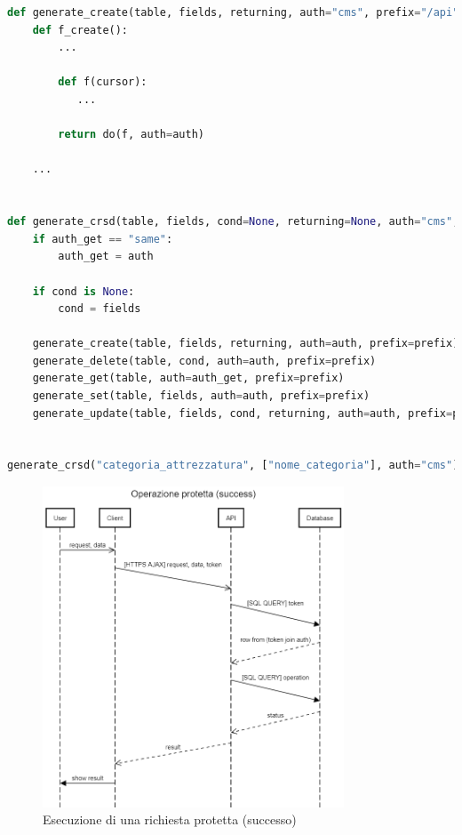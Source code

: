 \documentclass[12pt,a4paper,twoside,english,italian]{book}
\begin{document}
\begin{lstlisting}[language=Python, caption=Esempio di funzione generatrice di endpoint modificata e relativa chiamata]
def generate_create(table, fields, returning, auth="cms", prefix="/api"):
    def f_create():
        ...

        def f(cursor):
           ...

        return do(f, auth=auth)

    ...
    
    
def generate_crsd(table, fields, cond=None, returning=None, auth="cms", auth_get="login", prefix="/api"):
    if auth_get == "same":
        auth_get = auth

    if cond is None:
        cond = fields

    generate_create(table, fields, returning, auth=auth, prefix=prefix)
    generate_delete(table, cond, auth=auth, prefix=prefix)
    generate_get(table, auth=auth_get, prefix=prefix)
    generate_set(table, fields, auth=auth, prefix=prefix)
    generate_update(table, fields, cond, returning, auth=auth, prefix=prefix)
    
    
generate_crsd("categoria_attrezzatura", ["nome_categoria"], auth="cms")
\end{lstlisting}

\begin{figure}[H]
    \centering
    \includegraphics[width=0.8\textwidth]{img/Operazione protetta (success).png}
    \caption{Esecuzione di una richiesta protetta (successo)}
\end{figure}
\end{document}
